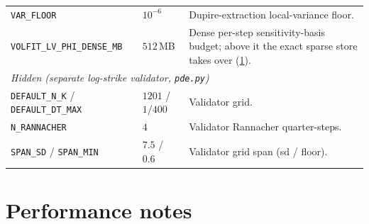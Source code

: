 \documentclass[11pt]{article}
\begin{document}
\begin{longtable}{p{}p{}p{}}
\texttt{VAR\_FLOOR} & $10^{-6}$ & Dupire-extraction local-variance floor.\\
\texttt{VOLFIT\_LV\_PHI\_DENSE\_MB} & $512$\,MB & Dense per-step
sensitivity-basis budget; above it the exact sparse store takes over
(\cref{app:perf}).\\
\midrule
\multicolumn{3}{l}{\emph{Hidden (separate log-strike validator, \texttt{pde.py})}}\\ \midrule
\texttt{DEFAULT\_N\_K} / \texttt{DEFAULT\_DT\_MAX} & $1201$ / $1/400$ & Validator grid.\\
\texttt{N\_RANNACHER} & $4$ & Validator Rannacher quarter-steps.\\
\texttt{SPAN\_SD} / \texttt{SPAN\_MIN} & $7.5$ / $0.6$ & Validator grid span (sd / floor).\\
\bottomrule
\end{longtable}

\section{Performance notes}
\label{app:perf}
\end{document}
